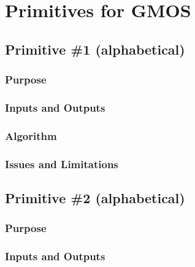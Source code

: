 \documentclass[letterpaper,10pt,english]{sphinxmanual}
\begin{document}
\section{Primitives for GMOS}
\label{GMOS/primitives:primitives-for-gmos}\label{GMOS/primitives:gmos-primitives}\label{GMOS/primitives::doc}

\subsection{Primitive \#1  (alphabetical)}
\label{GMOS/primitives_pages/primitive1:gmos-primitive-1}\label{GMOS/primitives_pages/primitive1:primitive-1-alphabetical}\label{GMOS/primitives_pages/primitive1::doc}

\subsubsection{Purpose}
\label{GMOS/primitives_pages/primitive1:purpose}

\subsubsection{Inputs and Outputs}
\label{GMOS/primitives_pages/primitive1:inputs-and-outputs}

\subsubsection{Algorithm}
\label{GMOS/primitives_pages/primitive1:algorithm}

\subsubsection{Issues and Limitations}
\label{GMOS/primitives_pages/primitive1:issues-and-limitations}

\subsection{Primitive \#2  (alphabetical)}
\label{GMOS/primitives_pages/primitive2:primitive-2-alphabetical}\label{GMOS/primitives_pages/primitive2:gmos-primitive-2}\label{GMOS/primitives_pages/primitive2::doc}

\subsubsection{Purpose}
\label{GMOS/primitives_pages/primitive2:purpose}

\subsubsection{Inputs and Outputs}
\label{GMOS/primitives_pages/primitive2:inputs-and-outputs}
\end{document}

